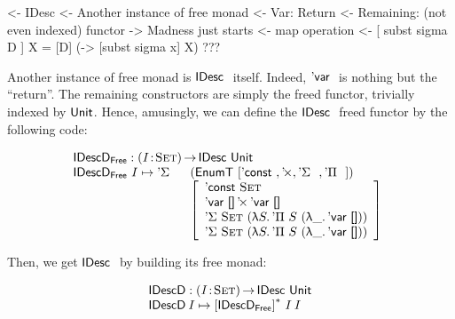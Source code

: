 \begin{wstructure}
<- IDesc
    <- Another instance of free monad
        <- Var: Return
        <- Remaining: (not even indexed) functor
    -> Madness just starts
        <- map operation
        <- [ subst sigma D ] X = [D] (\x -> [subst sigma x] X)
        ???
\end{wstructure}

Another instance of free monad is $\IDesc$ itself. Indeed, $\DVar$ is
nothing but the ``return''. The remaining constructors are simply the
freed functor, trivially indexed by $\Unit$. Hence, amusingly, we can
define the $\IDesc$ freed functor by the following code:

\[\stk{
\IDescFreeD : \PI{\V{I}}{\Set} \IDesc{\Unit} \\
\begin{array}{@{}ll}
\IDescFreeD~I \mapsto \DSigma{}{} & (\EnumT [ \DConst{},
                                              \DProd{}{},
                                              \DSigma{}{}, 
                                              \DPi{}{} ]) \\
                                  & \left[\begin{array}{l}
                                        \DConst{\Set}               \\
                                        \DProd{\DVar{\Void}}{\DVar{\Void}}  \\
                                        \DSigma{\Set}{(\LAM{S} \DPi{S}{(\LAM{\_} \DVar{\Void})})} \\
                                        \DSigma{\Set}{(\LAM{S} \DPi{S}{(\LAM{\_} \DVar{\Void})})}
                                    \end{array}\right]
\end{array}
}\]

Then, we get $\IDesc$ by building its free monad:

\[\stk{
\IDescD : \PI{\V{I}}{\Set} \IDesc{\Unit} \\
\IDescD\: I \mapsto \FreeMonad{[\IDescFreeD]}{I}\: I
}\]


